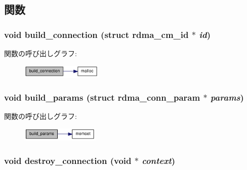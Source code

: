 \subsection{関数}
\hypertarget{rdma-common_8h_a57b367ce7e3ae058aa4e2ad739e13ec2}{
\subsubsection[{build\_\-connection}]{\setlength{\rightskip}{0pt plus 5cm}void build\_\-connection (struct rdma\_\-cm\_\-id $\ast$ {\em id})}}
\label{rdma-common_8h_a57b367ce7e3ae058aa4e2ad739e13ec2}


関数の呼び出しグラフ:\nopagebreak
\begin{figure}[H]
\begin{center}
\leavevmode
\includegraphics[width=110pt]{rdma-common_8h_a57b367ce7e3ae058aa4e2ad739e13ec2_cgraph}
\end{center}
\end{figure}
\hypertarget{rdma-common_8h_a1fa64af8a437eea7c184fbae1713e7cb}{
\subsubsection[{build\_\-params}]{\setlength{\rightskip}{0pt plus 5cm}void build\_\-params (struct rdma\_\-conn\_\-param $\ast$ {\em params})}}
\label{rdma-common_8h_a1fa64af8a437eea7c184fbae1713e7cb}


関数の呼び出しグラフ:\nopagebreak
\begin{figure}[H]
\begin{center}
\leavevmode
\includegraphics[width=106pt]{rdma-common_8h_a1fa64af8a437eea7c184fbae1713e7cb_cgraph}
\end{center}
\end{figure}
\hypertarget{rdma-common_8h_a54feeefad62ea6509ced24a1a06a7a6e}{
\subsubsection[{destroy\_\-connection}]{\setlength{\rightskip}{0pt plus 5cm}void destroy\_\-connection (void $\ast$ {\em context})}}
\label{rdma-common_8h_a54feeefad62ea6509ced24a1a06a7a6e}


